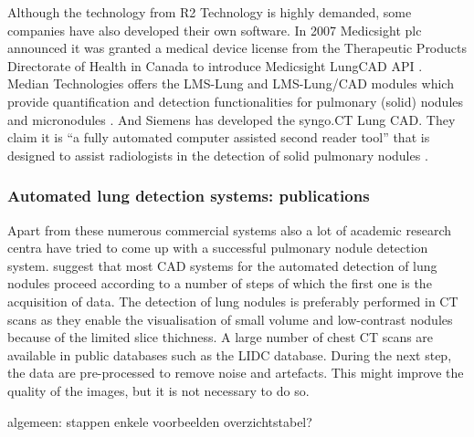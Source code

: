 Although the technology from R2 Technology is highly demanded, some companies
have also developed their own software. In 2007 Medicsight plc announced it was
granted a medical device license from the Therapeutic Products Directorate of
Health in Canada to introduce Medicsight LungCAD API \cite{HI}.
Median Technologies offers the LMS-Lung and LMS-Lung/CAD modules which provide
quantification and detection functionalities for pulmonary (solid) nodules and
micronodules \cite{median}. And Siemens has developed the syngo.CT Lung CAD.
They claim it is ``a fully automated computer assisted second reader tool'' that is designed to assist radiologists in
the detection of solid pulmonary nodules \cite{siemens}.

\subsubsection{Automated lung detection systems: publications}
Apart from these numerous commercial systems also a lot of academic research
centra have tried to come up with a successful pulmonary nodule detection
system. \cite{review} suggest that most CAD systems for the automated detection
of lung nodules proceed according to a number of steps of which the first one is
the acquisition of data. The detection of lung nodules is preferably performed
in CT scans as they enable the visualisation of small volume and low-contrast
nodules because of the limited slice thichness. A large number of chest CT scans
are available in public databases such as the LIDC database. During the next
step, the data are pre-processed to remove noise and artefacts. This might
improve the quality of the images, but it is not necessary to do so.

algemeen: stappen
enkele voorbeelden
overzichtstabel?

